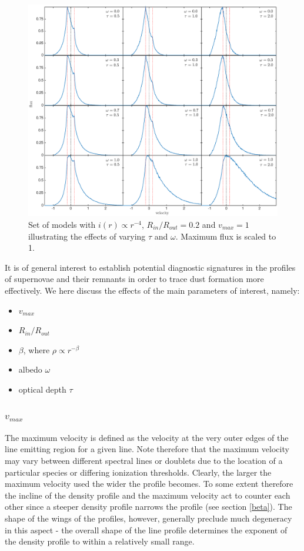 \documentclass[useAMS,usenatbib,usegraphicx]{mnras}
\begin{document}
\begin{figure}
\includegraphics[trim =80 10 40 15,clip=true,scale=0.515]{params/C/C_all} 
\caption{Set of models with $i(r) \propto r^{-4}$, $R_{in}/R_{out}=0.2$ and $v_{max}=1$ illustrating the effects of varying $\tau$ and $\omega$. Maximum flux is scaled to 1. }
\label{wt}
\end{figure}


It is of general interest to establish potential diagnostic signatures in the profiles of supernovae and their remnants in order to trace dust formation more effectively.  We here discuss the effects of the main parameters of interest, namely:

\begin{itemize}
\item $v_{max}$
\item $R_{in}/R_{out}$
\item $\beta$, where $\rho \propto r^{-\beta}$
\item albedo $\omega$ 
\item optical depth  $\tau$
\end{itemize}


\subsubsection{$v_{max}$}
The maximum velocity is defined as the velocity at the very outer edges of the line emitting region for a given line.  Note therefore that the maximum velocity may vary between different spectral lines or doublets due to the location of a particular species or differing ionization thresholds.  Clearly, the larger the maximum velocity used the wider the profile becomes.  To some extent therefore the incline of the density profile and the maximum velocity act to counter each other since a steeper density profile narrows the profile (see section \ref{beta}).  The shape of the wings of the profiles, however, generally preclude much degeneracy in this aspect - the overall shape of the line profile determines the exponent of the density profile to within a relatively small range.
\end{document}
